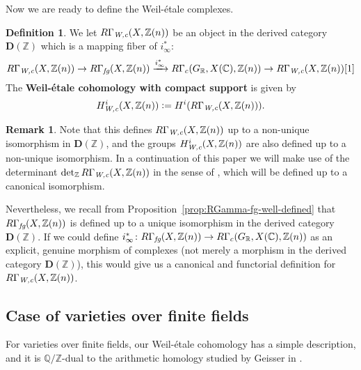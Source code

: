 \documentclass[leqno,12pt]{article}
\theoremstyle{plain}
\theoremstyle{definition}
\newtheorem{definition}[theorem]{\indent\sc Definition}
\newtheorem{remark}[theorem]{\indent\sc Remark}
\newcommand{\CC}{\mathbb{C}}
\newcommand{\QQ}{\mathbb{Q}}
\newcommand{\RR}{\mathbb{R}}
\newcommand{\ZZ}{\mathbb{Z}}
\newcommand{\dfn}{\mathrel{\mathop:}=}
\newcommand{\Wc}{\text{\it W,c}}
\newcommand{\fg}{\text{\it fg}}
\newcommand{\DZ}{{\mathbf{D} (\ZZ)}}
\begin{document}
Now we are ready to define the Weil-\'{e}tale complexes.

\begin{definition}
  \label{dfn:RGammaWc}
  We let
  $R\Gamma_\Wc (X,\ZZ(n))$ be an object in the derived category
  $\DZ$ which is a mapping fiber of $i_\infty^*$:
  \[ R\Gamma_\Wc (X,\ZZ(n)) \to
  R\Gamma_\fg (X, \ZZ (n)) \xrightarrow{i_\infty^*}
  R\Gamma_c (G_\RR, X (\CC), \ZZ (n)) \to
  R\Gamma_\Wc (X,\ZZ(n)) [1] \]
  The \textbf{Weil-\'{e}tale cohomology with compact support} is given by
  $$H_\Wc^i (X, \ZZ (n)) \dfn H^i (R\Gamma_\Wc (X,\ZZ(n))).$$
\end{definition}

\begin{remark}
  Note that this defines $R\Gamma_\Wc (X,\ZZ(n))$ up to a non-unique isomorphism
  in $\DZ$, and the groups $H_\Wc^i (X, \ZZ (n))$ are also defined
  up to a non-unique isomorphism. In a continuation of this paper we will make
  use of the determinant $\det\nolimits_\ZZ R\Gamma_\Wc (X,\ZZ(n))$ in the
  sense of \cite{Knudsen-Mumford-1976}, which will be defined up to a canonical
  isomorphism.

  Nevertheless, we recall from Proposition~\ref{prop:RGamma-fg-well-defined}
  that $R\Gamma_\fg (X, \ZZ (n))$ is defined up to a unique isomorphism in the
  derived category $\DZ$. If we could define
  $i_\infty^*\colon R\Gamma_\fg (X, \ZZ(n)) \to R\Gamma_c (G_\RR, X(\CC), \ZZ(n))$
  as an explicit, genuine morphism of complexes (not merely a morphism in the
  derived category $\DZ$), this would give us a canonical and
  functorial definition for $R\Gamma_\Wc (X, \ZZ(n))$.
\end{remark}

\subsection*{Case of varieties over finite fields}

For varieties over finite fields, our Weil-\'{e}tale cohomology has a simple
description, and it is $\QQ/\ZZ$-dual to the arithmetic homology studied by
Geisser in \cite{Geisser-2010-arithmetic-homology}.
\end{document}
